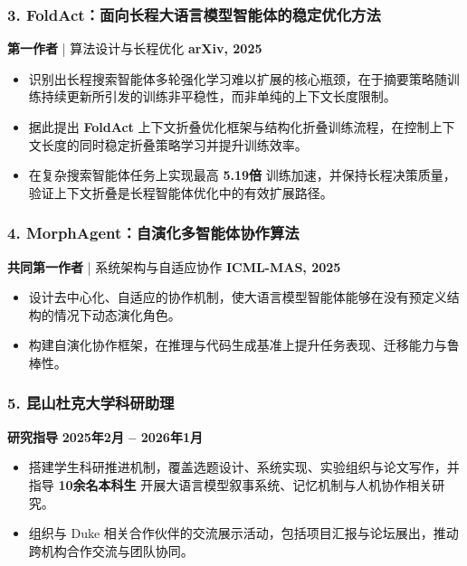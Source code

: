 \documentclass[10pt,a4paper]{article}
\begin{document}
\subsubsection*{3. \color{itemcolor}FoldAct：面向长程大语言模型智能体的稳定优化方法}
\noindent\textbf{\color{sectioncolor}第一作者} | 算法设计与长程优化 \hfill \color{accentcolor}\textbf{arXiv, 2025}
\begin{itemize}[leftmargin=*]
    \item 识别出长程搜索智能体多轮强化学习难以扩展的核心瓶颈，在于摘要策略随训练持续更新所引发的训练非平稳性，而非单纯的上下文长度限制。
    \item 据此提出 \textbf{FoldAct} 上下文折叠优化框架与结构化折叠训练流程，在控制上下文长度的同时稳定折叠策略学习并提升训练效率。
    \item 在复杂搜索智能体任务上实现最高 \textbf{5.19倍} 训练加速，并保持长程决策质量，验证上下文折叠是长程智能体优化中的有效扩展路径。
\end{itemize}

\subsubsection*{4. \color{itemcolor}MorphAgent：自演化多智能体协作算法}
\noindent\textbf{\color{sectioncolor}共同第一作者} | 系统架构与自适应协作 \hfill \color{accentcolor}\textbf{ICML-MAS, 2025}
\begin{itemize}[leftmargin=*]
    \item 设计去中心化、自适应的协作机制，使大语言模型智能体能够在没有预定义结构的情况下动态演化角色。
    \item 构建自演化协作框架，在推理与代码生成基准上提升任务表现、迁移能力与鲁棒性。
\end{itemize}

\subsubsection*{5. \color{itemcolor}昆山杜克大学科研助理}
\noindent\textbf{\color{sectioncolor}研究指导} \hfill \color{accentcolor}\textbf{2025年2月 -- 2026年1月}
\begin{itemize}[leftmargin=*]
    \item 搭建学生科研推进机制，覆盖选题设计、系统实现、实验组织与论文写作，并指导 \textbf{10余名本科生} 开展大语言模型叙事系统、记忆机制与人机协作相关研究。
    \item 组织与 Duke 相关合作伙伴的交流展示活动，包括项目汇报与论坛展出，推动跨机构合作交流与团队协同。
\end{itemize}
\end{document}
